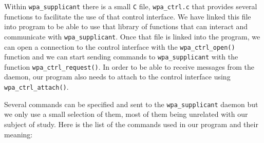 Within \texttt{wpa\_supplicant} there is a small \texttt{C} file, \texttt{wpa\_ctrl.c} that provides several functions to facilitate the use of that control interface. We have linked this file into program to be able to use that library of functions that can interact and communicate with \texttt{wpa\_supplicant}. Once that file is linked into the program, we can open a connection to the control interface with the \texttt{wpa\_ctrl\_open()} function and we can start sending commands to \texttt{wpa\_supplicant} with the function \texttt{wpa\_ctrl\_request()}. In order to be able to receive messages from the daemon, our program also needs to attach to the control interface using \texttt{wpa\_ctrl\_attach()}.

Several commands can be specified and sent to the \texttt{wpa\_supplicant} daemon but we only use a small selection of them, most of them being unrelated with our subject of study. Here is the list of the commands used in our program and their meaning:
